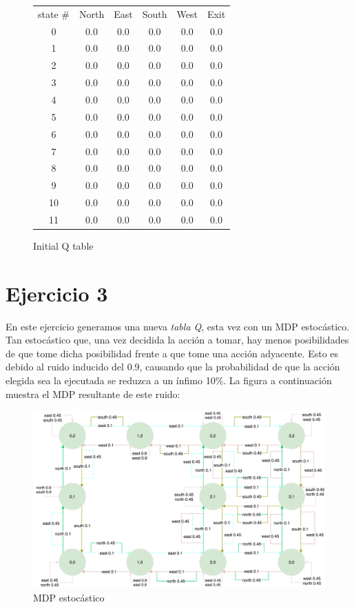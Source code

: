 \documentclass[12pt]{article}
\begin{document}
\begin{figure}[h]
    \centering
        \begin{tabular}{*{6}{c}}
            state \# & North & East & South & West & Exit\\
            0 & 0.0 & 0.0 & 0.0 & 0.0 & 0.0 \\
            1 & 0.0 & 0.0 & 0.0 & 0.0 & 0.0 \\
            2 & 0.0 & 0.0 & 0.0 & 0.0 & 0.0 \\
            3 & 0.0 & 0.0 & 0.0 & 0.0 & 0.0 \\
            4 & 0.0 & 0.0 & 0.0 & 0.0 & 0.0 \\
            5 & 0.0 & 0.0 & 0.0 & 0.0 & 0.0 \\
            6 & 0.0 & 0.0 & 0.0 & 0.0 & 0.0 \\
            7 & 0.0 & 0.0 & 0.0 & 0.0 & 0.0 \\
            8 & 0.0 & 0.0 & 0.0 & 0.0 & 0.0 \\
            9 & 0.0 & 0.0 & 0.0 & 0.0 & 0.0 \\
            10 & 0.0 & 0.0 & 0.0 & 0.0 & 0.0 \\
            11 & 0.0 & 0.0 & 0.0 & 0.0 & 0.0 \\
        \end{tabular}
    \caption{Initial Q table}
    \label{fig:test}
\end{figure}

\newpage
\section{Ejercicio 3}


En este ejercicio generamos una nueva \textit{tabla Q}, esta vez con un MDP estocástico. Tan estocástico que, una vez decidida la acción a tomar, hay menos posibilidades de que tome dicha posibilidad frente a que tome una acción adyacente. Esto es debido al ruido inducido del 0.9, causando que la probabilidad de que la acción elegida sea la ejecutada se reduzca a un ínfimo 10\%. La figura a continuación muestra el MDP resultante de este ruido:

\begin{figure}[h]
    \includegraphics[width=\textwidth]{MDP_stochastic_09}
    \caption{MDP estocástico}
\end{figure}
\end{document}
